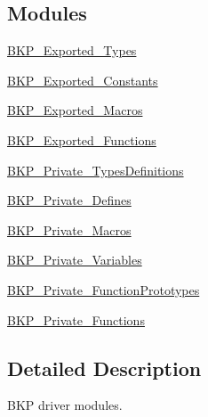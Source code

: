 \subsection*{Modules}
\begin{DoxyCompactItemize}
\item 
\hyperlink{group___b_k_p___exported___types}{B\+K\+P\+\_\+\+Exported\+\_\+\+Types}
\item 
\hyperlink{group___b_k_p___exported___constants}{B\+K\+P\+\_\+\+Exported\+\_\+\+Constants}
\item 
\hyperlink{group___b_k_p___exported___macros}{B\+K\+P\+\_\+\+Exported\+\_\+\+Macros}
\item 
\hyperlink{group___b_k_p___exported___functions}{B\+K\+P\+\_\+\+Exported\+\_\+\+Functions}
\item 
\hyperlink{group___b_k_p___private___types_definitions}{B\+K\+P\+\_\+\+Private\+\_\+\+Types\+Definitions}
\item 
\hyperlink{group___b_k_p___private___defines}{B\+K\+P\+\_\+\+Private\+\_\+\+Defines}
\item 
\hyperlink{group___b_k_p___private___macros}{B\+K\+P\+\_\+\+Private\+\_\+\+Macros}
\item 
\hyperlink{group___b_k_p___private___variables}{B\+K\+P\+\_\+\+Private\+\_\+\+Variables}
\item 
\hyperlink{group___b_k_p___private___function_prototypes}{B\+K\+P\+\_\+\+Private\+\_\+\+Function\+Prototypes}
\item 
\hyperlink{group___b_k_p___private___functions}{B\+K\+P\+\_\+\+Private\+\_\+\+Functions}
\end{DoxyCompactItemize}


\subsection{Detailed Description}
B\+KP driver modules. 

